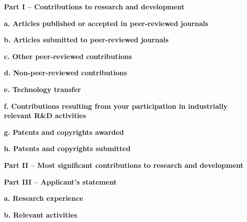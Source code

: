 \documentclass[12pt]{article} %
\begin{document}
\pagestyle{fancy}
\renewcommand{\headrulewidth}{0pt}
\setlength{\headheight}{14.49998pt}

%
%

\textbf{Part I – Contributions to research and development}

\textbf{a. Articles published or accepted in peer-reviewed journals}

\textbf{b. Articles submitted to peer-reviewed journals} %

\textbf{c. Other peer-reviewed contributions} %

\textbf{d. Non-peer-reviewed contributions} %

\textbf{e. Technology transfer}

\textbf{f. Contributions resulting from your participation in industrially relevant R\&D activities}

\textbf{g. Patents and copyrights awarded} %

\textbf{h. Patents and copyrights submitted}

\textbf{Part II – Most significant contributions to research and development}

\textbf{Part III – Applicant’s statement}

\textbf{a.  Research experience}

\textbf{b. Relevant activities}
\end{document}
